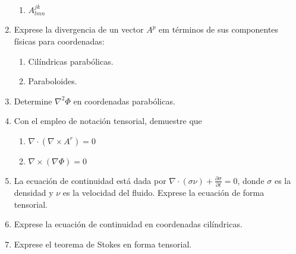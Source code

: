 \documentclass{modernhandout}
\begin{document}
\begin{enumerate}
\begin{enumerate}
        \item $A^{jk}_{lmn}$
    \end{enumerate}
    \item Exprese la divergencia de un vector $A^p$ em términos de sus componentes físicas para coordenadas:
    \begin{enumerate}
        \item Cilíndricas parabólicas.
        \item Paraboloides.
    \end{enumerate}
    \item Determine $\nabla^2\Phi$ en coordenadas parabólicas.
    \item Con el empleo de notación tensorial, demuestre que
    \begin{enumerate}
        \item $\nabla\cdot\left(\nabla\times A^r\right)=0$
        \item $\nabla\times\left(\nabla\Phi\right)=0$
    \end{enumerate}
    \item La ecuación de continuidad está dada por $\nabla\cdot\left(\sigma\nu\right)+\frac{\partial\sigma}{\partial t}=0$, donde $\sigma$ es la densidad y $\nu$ es la velocidad del fluido. Exprese la ecuación de forma tensorial.
    \item Exprese la ecuación de continuidad en coordenadas cilíndricas.
    \item Exprese el teorema de Stokes en forma tensorial.
\end{enumerate}
\end{document}
